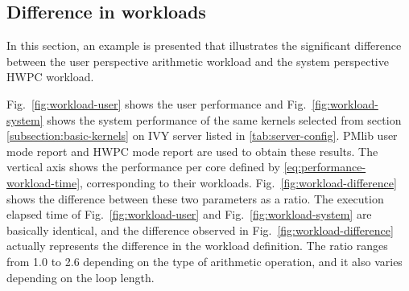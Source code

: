 \documentclass[conference]{IEEEtran}
\begin{document}
%
\subsection{Difference in workloads}
\label{subsection:difference-in-workloads}

In this section, an example is presented that illustrates the significant
difference between the user perspective arithmetic workload and
the system perspective HWPC workload.

Fig.~\ref{fig:workload-user} shows the user performance
and Fig.~\ref{fig:workload-system} shows the system performance
of the same kernels selected from section \ref{subsection:basic-kernels}
on IVY server listed in \ref{tab:server-config}.
PMlib user mode report and HWPC mode report are used to obtain these results.
The vertical axis shows the performance per core
defined by \eqref{eq:performance-workload-time},
corresponding to their workloads.
Fig.~\ref{fig:workload-difference} shows the difference between these two
parameters as a ratio.
%
%
The execution elapsed time
of Fig.~\ref{fig:workload-user} and Fig.~\ref{fig:workload-system} are
basically identical, and the difference observed in
Fig.~\ref{fig:workload-difference} 
actually represents the difference in the workload definition.
The ratio ranges from 1.0 to 2.6 depending on the type of
arithmetic operation, and it also varies depending on the loop length.
\end{document}
